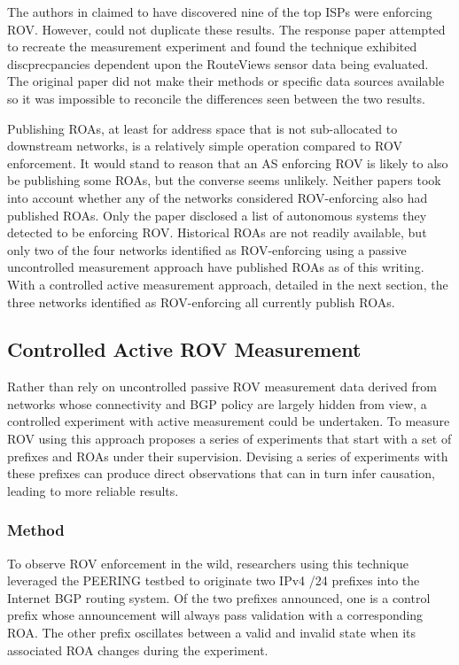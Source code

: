 \documentclass[sigconf]{acmart}
\begin{document}
The authors in \cite{gilad_are_2017} claimed to have discovered nine of
the top ISPs were enforcing ROV.  However, \cite{reuter_towards_2018}
could not duplicate these results.  The response paper attempted to
recreate the measurement experiment and found the technique exhibited
discprecpancies dependent upon the RouteViews sensor data being
evaluated.  The original paper did not make their methods or specific
data sources available so it was impossible to reconcile the differences
seen between the two results.

Publishing ROAs, at least for address space that is not sub-allocated to
downstream networks, is a relatively simple operation compared to ROV
enforcement.  It would stand to reason that an AS enforcing ROV is
likely to also be publishing some ROAs, but the converse seems unlikely.
Neither papers took into account whether any of the networks considered
ROV-enforcing also had published ROAs.  Only
the\cite{reuter_towards_2018} paper disclosed a list of autonomous
systems they detected to be enforcing ROV.  Historical ROAs are not
readily available, but only two of the four networks identified as
ROV-enforcing using a passive uncontrolled measurement approach have
published ROAs as of this writing.  With a controlled active
measurement approach, detailed in the next section, the three networks
identified as ROV-enforcing all currently publish ROAs.

\subsection{Controlled Active ROV Measurement}

Rather than rely on uncontrolled passive ROV measurement data derived
from networks whose connectivity and BGP policy are largely hidden from
view, a controlled experiment with active measurement could be
undertaken.  To measure ROV using this approach
\cite{reuter_towards_2018} proposes a series of experiments that start
with a set of prefixes and ROAs under their supervision.  Devising a
series of experiments with these prefixes can produce direct
observations that can in turn infer causation, leading to more reliable
results.

\subsubsection{Method}

To observe ROV enforcement in the wild, researchers using this technique
leveraged the PEERING testbed to originate two IPv4 /24 prefixes into
the Internet BGP routing system.\cite{schlinker_peering:_2014}  Of the
two prefixes announced, one is a control prefix whose announcement will
always pass validation with a corresponding ROA.  The other prefix
oscillates between a valid and invalid state when its associated ROA
changes during the experiment.
\end{document}
